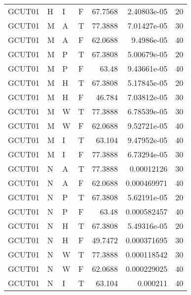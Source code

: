 \begin{longtable}{llllrrr}
    GCUT01   & H         & I         & F          & 67.7568    & 2.40803e-05 & 20       \\
    GCUT01   & M         & A         & T          & 77.3888    & 7.01427e-05 & 30       \\
    GCUT01   & M         & A         & F          & 62.0688    & 9.4986e-05  & 40       \\
    GCUT01   & M         & P         & T          & 67.3808    & 5.00679e-05 & 20       \\
    GCUT01   & M         & P         & F          & 63.48      & 9.43661e-05 & 40       \\
    GCUT01   & M         & H         & T          & 67.3808    & 5.17845e-05 & 20       \\
    GCUT01   & M         & H         & F          & 46.784     & 7.03812e-05 & 30       \\
    GCUT01   & M         & W         & T          & 77.3888    & 6.78539e-05 & 30       \\
    GCUT01   & M         & W         & F          & 62.0688    & 9.52721e-05 & 40       \\
    GCUT01   & M         & I         & T          & 63.104     & 9.47952e-05 & 40       \\
    GCUT01   & M         & I         & F          & 77.3888    & 6.73294e-05 & 30       \\
    GCUT01   & N         & A         & T          & 77.3888    & 0.00012126  & 30       \\
    GCUT01   & N         & A         & F          & 62.0688    & 0.000469971 & 40       \\
    GCUT01   & N         & P         & T          & 67.3808    & 5.62191e-05 & 20       \\
    GCUT01   & N         & P         & F          & 63.48      & 0.000582457 & 40       \\
    GCUT01   & N         & H         & T          & 67.3808    & 5.49316e-05 & 20       \\
    GCUT01   & N         & H         & F          & 49.7472    & 0.000371695 & 30       \\
    GCUT01   & N         & W         & T          & 77.3888    & 0.000118542 & 30       \\
    GCUT01   & N         & W         & F          & 62.0688    & 0.000229025 & 40       \\
    GCUT01   & N         & I         & T          & 63.104     & 0.000211    & 40       \\

\end{longtable}

